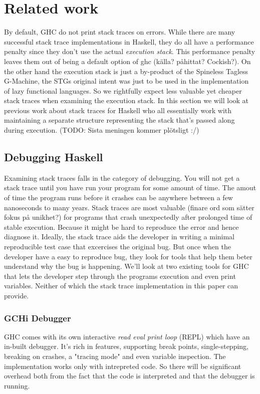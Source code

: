 \section{Related work}

By default, GHC do not print stack traces on errors. While there are many
successful stack trace implementations in Haskell, they do all have a
performance penalty since they don't use the actual \emph{execution stack}.
This performance penalty leaves them out of being a default option of ghc
(källa?  påhittat? Cockish?).  On the other hand the execution stack is just a
by-product of the Spineless Tagless G-Machine, the STGs original intent was
just to be used in the implementation of lazy functional languages.  So we
rightfully expect less valuable yet cheaper stack traces when examining the
execution stack.  In this section we will look at previous work about stack
traces for Haskell who all essentially work with maintaining a separate
structure representing the stack that's passed along during execution.
(TODO: Sista meningen kommer plötsligt :/)

\subsection{Debugging Haskell}

Examining stack traces falls in the category of debugging. You will not
get a stack trace until you have run your program for some amount of
time. The amout of time the program runs before it crashes can be
anywhere between a few nanoseconds to many years. Stack traces are most
valuable (finare ord som sätter fokus på unikhet?) for programs that
crash unexpectedly after prolonged time of stable execution. Because it
might be hard to reproduce the error and hence diagnose it. Ideally, the
stack trace aids the developer in writing a minimal reproducible test
case that excercises the original bug.  But once when the developer have
a easy to reproduce bug, they look for tools that help them beter
understand why the bug is happening. We'll look at two existing tools
for GHC that lets the developer step through the programs execution and
even print variables. Neither of which the stack trace implementation in
this paper can provide.

\subsubsection{GCHi Debugger}

GHC comes with its own interactive \emph{read eval print loop} (REPL)
which have an in-built debugger. It's rich in features, supporting break
points, single-stepping, breaking on crashes, a "tracing mode" and even
variable inspection. The implementation works only with intrepreted
code. \cite{ghci_debugger} So there will be significant overhead both
from the fact that the code is interpreted and that the debugger is
running.


